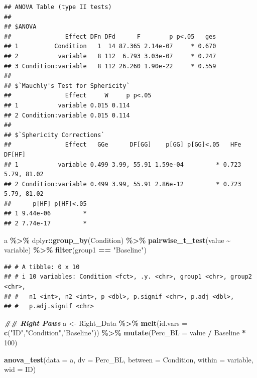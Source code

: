 \documentclass[
]{book}
\newenvironment{Shaded}{\begin{snugshade}}{\end{snugshade}}
\newcommand{\AttributeTok}[1]{\textcolor[rgb]{0.13,0.29,0.53}{#1}}
\newcommand{\DecValTok}[1]{\textcolor[rgb]{0.00,0.00,0.81}{#1}}
\newcommand{\DocumentationTok}[1]{\textcolor[rgb]{0.56,0.35,0.01}{\textbf{\textit{#1}}}}
\newcommand{\FunctionTok}[1]{\textcolor[rgb]{0.13,0.29,0.53}{\textbf{#1}}}
\newcommand{\NormalTok}[1]{#1}
\newcommand{\OtherTok}[1]{\textcolor[rgb]{0.56,0.35,0.01}{#1}}
\newcommand{\SpecialCharTok}[1]{\textcolor[rgb]{0.81,0.36,0.00}{\textbf{#1}}}
\newcommand{\StringTok}[1]{\textcolor[rgb]{0.31,0.60,0.02}{#1}}
\begin{document}
\begin{verbatim}
## ANOVA Table (type II tests)
## 
## $ANOVA
##               Effect DFn DFd      F        p p<.05   ges
## 1          Condition   1  14 87.365 2.14e-07     * 0.670
## 2           variable   8 112  6.793 3.03e-07     * 0.247
## 3 Condition:variable   8 112 26.260 1.90e-22     * 0.559
## 
## $`Mauchly's Test for Sphericity`
##               Effect     W     p p<.05
## 1           variable 0.015 0.114      
## 2 Condition:variable 0.015 0.114      
## 
## $`Sphericity Corrections`
##               Effect   GGe      DF[GG]    p[GG] p[GG]<.05   HFe      DF[HF]
## 1           variable 0.499 3.99, 55.91 1.59e-04         * 0.723 5.79, 81.02
## 2 Condition:variable 0.499 3.99, 55.91 2.86e-12         * 0.723 5.79, 81.02
##      p[HF] p[HF]<.05
## 1 9.44e-06         *
## 2 7.74e-17         *
\end{verbatim}

\begin{Shaded}
\begin{Highlighting}[]
\NormalTok{a }\SpecialCharTok{\%\textgreater{}\%}
\NormalTok{  dplyr}\SpecialCharTok{::}\FunctionTok{group\_by}\NormalTok{(Condition) }\SpecialCharTok{\%\textgreater{}\%}
  \FunctionTok{pairwise\_t\_test}\NormalTok{(value }\SpecialCharTok{\textasciitilde{}}\NormalTok{ variable) }\SpecialCharTok{\%\textgreater{}\%}
  \FunctionTok{filter}\NormalTok{(group1 }\SpecialCharTok{==} \StringTok{"Baseline"}\NormalTok{)}
\end{Highlighting}
\end{Shaded}

\begin{verbatim}
## # A tibble: 0 x 10
## # i 10 variables: Condition <fct>, .y. <chr>, group1 <chr>, group2 <chr>,
## #   n1 <int>, n2 <int>, p <dbl>, p.signif <chr>, p.adj <dbl>,
## #   p.adj.signif <chr>
\end{verbatim}

\begin{Shaded}
\begin{Highlighting}[]
\DocumentationTok{\#\# Right Paws}
\NormalTok{a }\OtherTok{\textless{}{-}}\NormalTok{ Right\_Data }\SpecialCharTok{\%\textgreater{}\%}
  \FunctionTok{melt}\NormalTok{(}\AttributeTok{id.vars =} \FunctionTok{c}\NormalTok{(}\StringTok{"ID"}\NormalTok{,}\StringTok{"Condition"}\NormalTok{,}\StringTok{"Baseline"}\NormalTok{)) }\SpecialCharTok{\%\textgreater{}\%}
  \FunctionTok{mutate}\NormalTok{(}\AttributeTok{Perc\_BL =}\NormalTok{ value }\SpecialCharTok{/}\NormalTok{ Baseline }\SpecialCharTok{*} \DecValTok{100}\NormalTok{) }
  
\FunctionTok{anova\_test}\NormalTok{(}\AttributeTok{data =}\NormalTok{ a, }\AttributeTok{dv =}\NormalTok{ Perc\_BL, }\AttributeTok{between =}\NormalTok{ Condition, }\AttributeTok{within =}\NormalTok{ variable, }\AttributeTok{wid =}\NormalTok{ ID)}
\end{Highlighting}
\end{Shaded}
\end{document}

